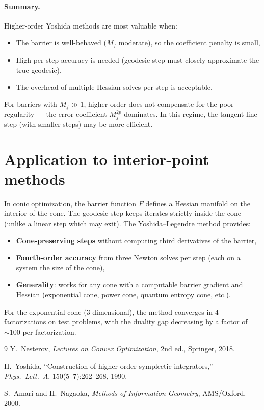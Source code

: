 \documentclass[11pt]{article}
\begin{document}
\paragraph{Summary.}
Higher-order Yoshida methods are most valuable when:
\begin{itemize}
  \item The barrier is well-behaved ($M_f$ moderate), so the
    coefficient penalty is small,
  \item High per-step accuracy is needed (geodesic step must closely
    approximate the true geodesic),
  \item The overhead of multiple Hessian solves per step is acceptable.
\end{itemize}
For barriers with $M_f \gg 1$, higher order does not compensate for
the poor regularity --- the error coefficient $M_f^{2p}$ dominates.
In this regime, the tangent-line step (with smaller steps) may be
more efficient.

\section{Application to interior-point methods}

In conic optimization, the barrier function $F$ defines a Hessian
manifold on the interior of the cone.  The geodesic step keeps
iterates strictly inside the cone (unlike a linear step which may
exit).  The Yoshida--Legendre method provides:
\begin{itemize}
  \item \textbf{Cone-preserving steps} without computing third
    derivatives of the barrier,
  \item \textbf{Fourth-order accuracy} from three Newton solves
    per step (each on a system the size of the cone),
  \item \textbf{Generality}: works for any cone with a computable
    barrier gradient and Hessian (exponential cone, power cone,
    quantum entropy cone, etc.).
\end{itemize}

For the exponential cone (3-dimensional), the method converges in
4 factorizations on test problems, with the duality gap decreasing
by a factor of $\sim\!100$ per factorization.

\begin{thebibliography}{9}
Y.~Nesterov, \emph{Lectures on Convex Optimization}, 2nd ed.,
Springer, 2018.

H.~Yoshida, ``Construction of higher order symplectic integrators,''
\emph{Phys.\ Lett.\ A}, 150(5--7):262--268, 1990.

S.~Amari and H.~Nagaoka, \emph{Methods of Information Geometry},
AMS/Oxford, 2000.
\end{thebibliography}
\end{document}
